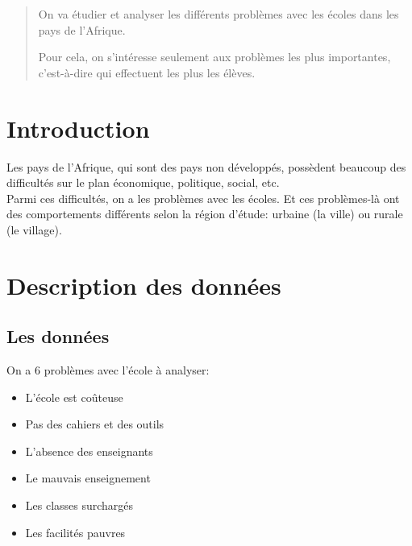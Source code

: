 \documentclass[a0, portrait]{a0poster}
\begin{document}

\begin{multicols}{3} %


\color{Navy} %

\begin{abstract}
On va étudier et analyser les différents problèmes avec les écoles dans les pays de l'Afrique.

Pour cela, on s'intéresse seulement aux problèmes les plus importantes, c'est-à-dire qui effectuent les plus les élèves.
\end{abstract}

\color{Black} %
\section*{Introduction}
Les pays de l'Afrique, qui sont des pays non développés, possèdent beaucoup des difficultés sur le plan économique, politique, social, etc.\\
Parmi ces difficultés, on a les problèmes avec les écoles.
Et ces problèmes-là ont des comportements différents selon la région d'étude: urbaine (la ville) ou rurale (le village).

\section*{Description des données}
\subsection*{Les données}
On a {\color{Red} 6} problèmes avec l'école à analyser:

\begin{itemize}
\item L'école est coûteuse
\item Pas des cahiers et des outils
\item L'absence des enseignants
\item Le mauvais enseignement
\item Les classes surchargés
\item Les facilités pauvres
\end{itemize}


\end{multicols}
\end{document}
